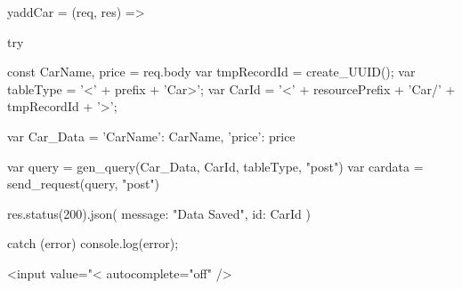 yaddCar = (req, res) => {
    try {
        const { CarName, price } = req.body
        var tmpRecordId = create_UUID();
        var tableType = '<' + prefix + 'Car>';
        var CarId = '<' + resourcePrefix + 'Car/' + tmpRecordId + '>';

        var Car_Data = {
            'CarName': CarName,
            'price': price
        }

        var query = gen_query(Car_Data, CarId, tableType, "post")
        var cardata = send_request(query, "post")

        res.status(200).json({ message: "Data Saved", id: CarId })
    } catch (error) {
        console.log(error);
    }
}

<input value="<%
autocomplete="off" />